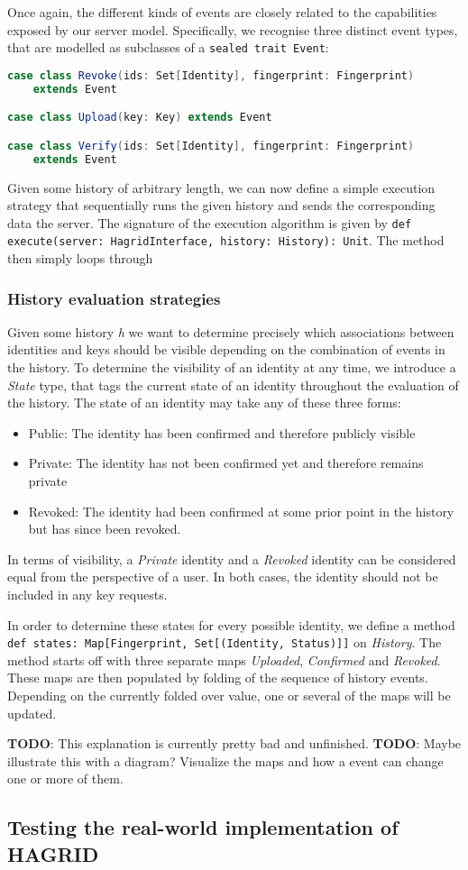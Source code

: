 Once again, the different kinds of events are closely related to the capabilities exposed by our server model. Specifically, we recognise three distinct event types, that are modelled as subclasses of a \lstinline{sealed trait Event}: 
\begin{lstlisting}[language=Scala]
case class Revoke(ids: Set[Identity], fingerprint: Fingerprint) 
    extends Event

case class Upload(key: Key) extends Event

case class Verify(ids: Set[Identity], fingerprint: Fingerprint) 
    extends Event
\end{lstlisting}

Given some history of arbitrary length, we can now define a simple execution strategy that sequentially runs the given history and sends the corresponding data the server.
The signature of the execution algorithm is given by \lstinline{def execute(server: HagridInterface, history: History): Unit}. The method then simply loops through 

\newpage

\subsubsection{History evaluation strategies}
Given some history \emph{h} we want to determine precisely which associations between identities and keys should be visible depending on the combination of events in the history.
To determine the visibility of an identity at any time, we introduce a \emph{State} type, that tags the current state of an identity throughout the evaluation of the history.
The state of an identity may take any of these three forms: 
\begin{itemize}
    \item Public: The identity has been confirmed and therefore publicly visible
    \item Private: The identity has not been confirmed yet and therefore remains private
    \item Revoked: The identity had been confirmed at some prior point in the history but has since been revoked.
\end{itemize}
In terms of visibility, a \emph{Private} identity and a \emph{Revoked} identity can be considered equal from the perspective of a user. In both cases, the identity should not be included in any key requests.

In order to determine these states for every possible identity, we define a method \lstinline{def states: Map[Fingerprint, Set[(Identity, Status)]]} on \emph{History}.
The method starts off with three separate maps \emph{Uploaded}, \emph{Confirmed} and \emph{Revoked}. These maps are then populated by folding of the sequence of history events.
Depending on the currently folded over value, one or several of the maps will be updated. 

\textbf{TODO}: This explanation is currently pretty bad and unfinished.
\textbf{TODO}: Maybe illustrate this with a diagram? Visualize the maps and how a event can change one or more of them.

\newpage
\subsection{Testing the real-world implementation of HAGRID}
\newpage